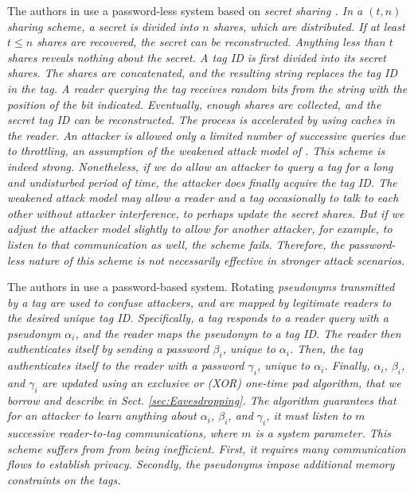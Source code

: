 The authors in \cite{journal:Langheinrich01} use a password-less system based on \em secret sharing \em \cite{journal:Shamir01}.  In a $\left(t,n\right)$ sharing scheme, a secret is divided into $n$ shares, which are distributed.  If at least $t \leq n$ shares are recovered, the secret can be reconstructed.  Anything less than $t$ shares reveals nothing about the secret.  A tag ID is first divided into its secret shares.  The shares are concatenated, and the resulting string replaces the tag ID in the tag.  A reader querying the tag receives random bits from the string with the position of the bit indicated.  Eventually, enough shares are collected, and the secret tag ID can be reconstructed.  The process is accelerated by using caches in the reader.  An attacker is allowed only a limited number of successive queries due to throttling, an assumption of the weakened attack model of \cite{conf:Juels01}.  This scheme is indeed strong.  Nonetheless, if we do allow an attacker to query a tag for a long and undisturbed period of time, the attacker does finally acquire the tag ID.  The weakened attack model may allow a reader and a tag occasionally to talk to each other without attacker interference, to perhaps update the secret shares.  But if we adjust the attacker model slightly to allow for another attacker, for example, to listen to that communication as well, the scheme fails.  Therefore, the password-less nature of this scheme is not necessarily effective in stronger attack scenarios.

The authors in \cite{conf:Juels01} use a password-based system.  Rotating \em pseudonyms \em transmitted by a tag are used to confuse attackers, and are mapped by legitimate readers to the desired unique tag ID.  Specifically, a tag responds to a reader query with a pseudonym $\alpha_i$, and the reader maps the pseudonym to a tag ID.  The reader then authenticates itself by sending a password $\beta_i$, unique to $\alpha_i$.  Then, the tag authenticates itself to the reader with a password $\gamma_i$, unique to $\alpha_i$.  Finally, $\alpha_i$, $\beta_i$, and $\gamma_i$ are updated using an exclusive or (XOR) one-time pad algorithm, that we borrow and describe in Sect. \ref{sec:Eavesdropping}.  The algorithm guarantees that for an attacker to learn anything about $\alpha_i$, $\beta_i$, and $\gamma_i$, it must listen to $m$ successive reader-to-tag communications, where $m$ is a system parameter.  This scheme suffers from from being inefficient.  First, it requires many communication flows to establish privacy.  Secondly, the pseudonyms impose additional memory constraints on the tags.


